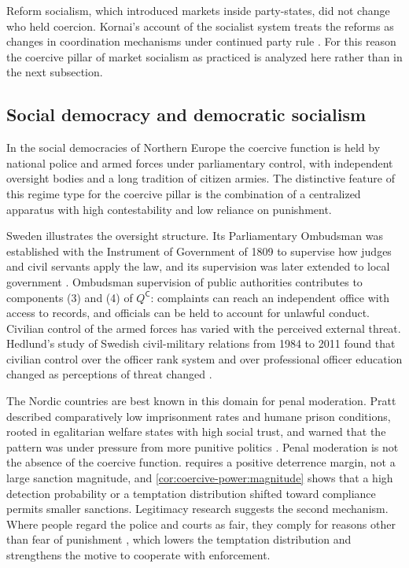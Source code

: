 \documentclass[11pt,letterpaper]{article}
\theoremstyle{definition}
\theoremstyle{remark}
\newcommand{\pC}{\mathsf{C}}
\begin{document}
Reform socialism, which introduced markets inside party-states, did not change who held coercion. Kornai's account of the socialist system treats the reforms as changes in coordination mechanisms under continued party rule \citep{kornai1992}. For this reason the coercive pillar of market socialism as practiced is analyzed here rather than in the next subsection.

\subsection{Social democracy and democratic socialism}
\label{sec:socdem}

In the social democracies of Northern Europe the coercive function is held by national police and armed forces under parliamentary control, with independent oversight bodies and a long tradition of citizen armies. The distinctive feature of this regime type for the coercive pillar is the combination of a centralized apparatus with high contestability and low reliance on punishment.

Sweden illustrates the oversight structure. Its Parliamentary Ombudsman was established with the Instrument of Government of 1809 to supervise how judges and civil servants apply the law, and its supervision was later extended to local government \citep{jo2026}. Ombudsman supervision of public authorities contributes to components (3) and (4) of $Q^{\pC}$: complaints can reach an independent office with access to records, and officials can be held to account for unlawful conduct. Civilian control of the armed forces has varied with the perceived external threat. Hedlund's study of Swedish civil-military relations from 1984 to 2011 found that civilian control over the officer rank system and over professional officer education changed as perceptions of threat changed \citep{hedlund2011}.

The Nordic countries are best known in this domain for penal moderation. Pratt described comparatively low imprisonment rates and humane prison conditions, rooted in egalitarian welfare states with high social trust, and warned that the pattern was under pressure from more punitive politics \citep{pratt2008a,pratt2008b}. Penal moderation is not the absence of the coercive function.  requires a positive deterrence margin, not a large sanction magnitude, and \cref{cor:coercive-power:magnitude} shows that a high detection probability or a temptation distribution shifted toward compliance permits smaller sanctions. Legitimacy research suggests the second mechanism. Where people regard the police and courts as fair, they comply for reasons other than fear of punishment \citep{tyler1990,jackson2012}, which lowers the temptation distribution and strengthens the motive to cooperate with enforcement.
\end{document}
